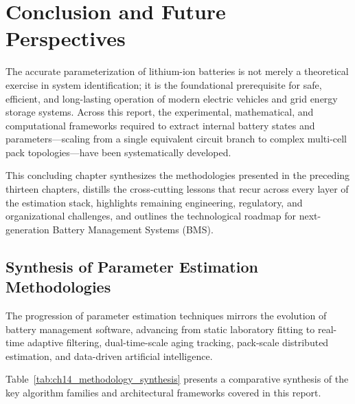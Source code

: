 
\chapter{Conclusion and Future Perspectives}
\label{chap:conclusion}

The accurate parameterization of lithium-ion batteries is not merely a theoretical exercise in system identification; it is the foundational prerequisite for safe, efficient, and long-lasting operation of modern electric vehicles and grid energy storage systems. Across this report, the experimental, mathematical, and computational frameworks required to extract internal battery states and parameters—scaling from a single equivalent circuit branch to complex multi-cell pack topologies—have been systematically developed.

This concluding chapter synthesizes the methodologies presented in the preceding thirteen chapters, distills the cross-cutting lessons that recur across every layer of the estimation stack, highlights remaining engineering, regulatory, and organizational challenges, and outlines the technological roadmap for next-generation Battery Management Systems (BMS).

\section{Synthesis of Parameter Estimation Methodologies}
\label{sec:14_summary_methodologies}

The progression of parameter estimation techniques mirrors the evolution of battery management software, advancing from static laboratory fitting to real-time adaptive filtering, dual-time-scale aging tracking, pack-scale distributed estimation, and data-driven artificial intelligence.

Table~\ref{tab:ch14_methodology_synthesis} presents a comparative synthesis of the key algorithm families and architectural frameworks covered in this report.

